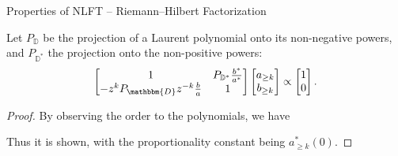 \begin{frame}{Properties of NLFT -- Riemann--Hilbert Factorization}
    \begin{theorem}
        Let $P_{\mathbb{D}}$ be the projection of a Laurent polynomial onto its non-negative powers, and $P_{\mathbb{D}^*}$ the projection onto the non-positive powers:
        \begin{equation}
            \left[\begin{matrix}
                1 & P_{\mathbb{D}^*}\frac{b^*}{a^*} \\
                -z^k P_{\mathbbm{D}}z^{-k}\frac{b}{a} & 1
            \end{matrix}\right] \left[\begin{matrix}
                a_{\ge k} \\ b_{\ge k}
            \end{matrix}\right] \propto \left[\begin{matrix}
                1 \\ 0
            \end{matrix}\right].
        \end{equation}
    \end{theorem}
    \begin{proof}
    By observing the order to the polynomials, we have
    \begin{center}
    \end{center}
    Thus it is shown, with the proportionality constant being $a_{\ge k}^*(0)$.
    \end{proof}
\end{frame}


